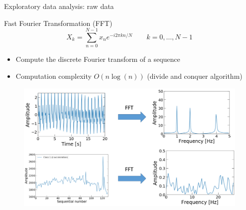 \documentclass{if-beamer}
\begin{document}
\begin{frame}{Exploratory data analysis: raw data}
        \begin{block}{Fast Fourier Transformation (FFT)}
        \begin{equation}
        	X_k = \sum_{n=0}^{N-1} x_n e^{-i2\pi k n/N}  \qquad k = 0,\dots,N-1 
       \end{equation}         
        \begin{itemize}
         \item Compute the discrete Fourier transform of a sequence
         \item Computation complexity $O(n\log(n))$ (divide and conquer algorithm)
         \end{itemize}
         
         \vspace{-0.25cm}
         
               \begin{figure}
                \includegraphics[scale=0.25]{./figs/FFT.png}
                \end{figure} 
   	 \end{block}
	
\end{frame}
\end{document}
